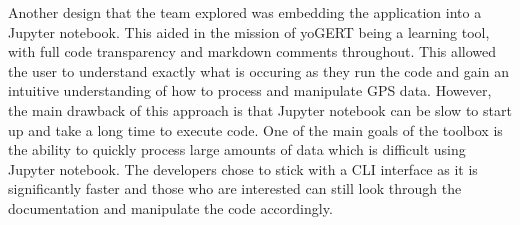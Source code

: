 \documentclass[12pt, titlepage]{article}
\begin{document}
\noindent Another design that the team explored was embedding the application into a Jupyter notebook. This aided in the mission of yoGERT being a learning tool, with full code transparency and markdown comments throughout. This allowed the user to understand exactly what is occuring as they run the code and gain an intuitive understanding of how to process and manipulate GPS data. However, the main drawback of this approach is that Jupyter notebook can be slow to start up and take a long time to execute code. One of the main goals of the toolbox is the ability to quickly process large amounts of data which is difficult using Jupyter notebook. The developers chose to stick with a CLI interface as it is significantly faster and those who are interested can still look through the documentation and manipulate the code accordingly. \\
\end{document}
